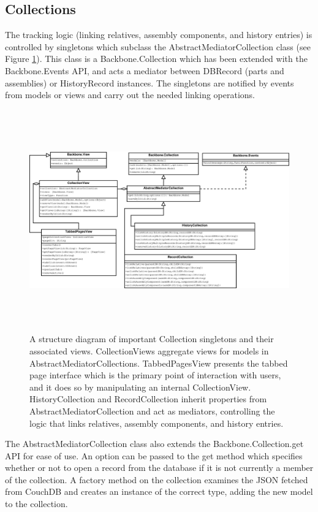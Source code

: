 \documentclass[journal]{IEEEtran}
\begin{document}
\subsection{Collections}
The tracking logic (linking relatives, assembly components, and history entries) is controlled
by singletons which subclass the AbstractMediatorCollection class (see Figure \ref{singletons}). This class is a Backbone.Collection
which has been extended with the Backbone.Events API, and acts a mediator between DBRecord (parts and assemblies) or
HistoryRecord instances. The singletons are notified by events from models or views and carry out the needed
linking operations.

\begin{figure}[!t]
\centering
\includegraphics[height=3.75in]{Singletons}
\caption{A structure diagram of important Collection singletons and their associated views. CollectionViews aggregate views for models in
AbstractMediatorCollections. TabbedPagesView presents the tabbed page interface which is the primary point of interaction with users, and it
does so by manipulating an internal CollectionView. HistoryCollection and RecordCollection inherit properties from AbstractMediatorCollection
and act as mediators, controlling the logic that links relatives, assembly components, and history entries.}
\label{singletons}
\end{figure}

The AbstractMediatorCollection class also extends the
Backbone.Collection.get API for ease of use. An option can be passed to the get method which
specifies whether or not to open a record from the database if it is not currently a member
of the collection.
A factory method on the collection examines the JSON
fetched from CouchDB and creates an instance of the correct type, adding the new model
to the collection. 
\end{document}
